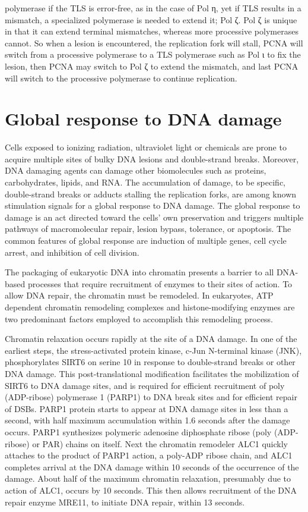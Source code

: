 polymerase if the TLS is error-free, as in the case of Pol η, yet if TLS results in a mismatch, a specialized polymerase is needed to extend it; Pol ζ. Pol ζ is unique in that it can extend terminal mismatches, whereas more processive polymerases cannot. So when a lesion is encountered, the replication fork will stall, PCNA will switch from a processive polymerase to a TLS polymerase such as Pol ι to fix the lesion, then PCNA may switch to Pol ζ to extend the mismatch, and last PCNA will switch to the processive polymerase to continue replication.

\hypertarget{global-response-to-dna-damage}{%
\section{Global response to DNA damage}\label{global-response-to-dna-damage}}

Cells exposed to ionizing radiation, ultraviolet light or chemicals are prone to acquire multiple sites of bulky DNA lesions and double-strand breaks. Moreover, DNA damaging agents can damage other biomolecules such as proteins, carbohydrates, lipids, and RNA. The accumulation of damage, to be specific, double-strand breaks or adducts stalling the replication forks, are among known stimulation signals for a global response to DNA damage. The global response to damage is an act directed toward the cells' own preservation and triggers multiple pathways of macromolecular repair, lesion bypass, tolerance, or apoptosis. The common features of global response are induction of multiple genes, cell cycle arrest, and inhibition of cell division.

The packaging of eukaryotic DNA into chromatin presents a barrier to all DNA-based processes that require recruitment of enzymes to their sites of action. To allow DNA repair, the chromatin must be remodeled. In eukaryotes, ATP dependent chromatin remodeling complexes and histone-modifying enzymes are two predominant factors employed to accomplish this remodeling process.

Chromatin relaxation occurs rapidly at the site of a DNA damage. In one of the earliest steps, the stress-activated protein kinase, c-Jun N-terminal kinase (JNK), phosphorylates SIRT6 on serine 10 in response to double-strand breaks or other DNA damage. This post-translational modification facilitates the mobilization of SIRT6 to DNA damage sites, and is required for efficient recruitment of poly (ADP-ribose) polymerase 1 (PARP1) to DNA break sites and for efficient repair of DSBs. PARP1 protein starts to appear at DNA damage sites in less than a second, with half maximum accumulation within 1.6 seconds after the damage occurs. PARP1 synthesizes polymeric adenosine diphosphate ribose (poly (ADP-ribose) or PAR) chains on itself. Next the chromatin remodeler ALC1 quickly attaches to the product of PARP1 action, a poly-ADP ribose chain, and ALC1 completes arrival at the DNA damage within 10 seconds of the occurrence of the damage. About half of the maximum chromatin relaxation, presumably due to action of ALC1, occurs by 10 seconds. This then allows recruitment of the DNA repair enzyme MRE11, to initiate DNA repair, within 13 seconds.

